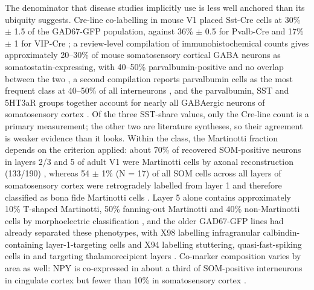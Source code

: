 \documentclass[11pt]{article}
\begin{document}
The denominator that disease studies implicitly use is less well anchored than its ubiquity suggests. Cre-line co-labelling in mouse V1 placed Sst-Cre cells at 30\% $\pm$ 1.5 of the GAD67-GFP population, against 36\% $\pm$ 0.5 for Pvalb-Cre and 17\% $\pm$ 1 for VIP-Cre \citep{Pfeffer2013}; a review-level compilation of immunohistochemical counts gives approximately 20--30\% of mouse somatosensory cortical GABA neurons as somatostatin-expressing, with 40--50\% parvalbumin-positive and no overlap between the two \citep{Lin2013}, a second compilation reports parvalbumin cells as the most frequent class at 40--50\% of all interneurons \citep{Williams2021}, and the parvalbumin, SST and 5HT3aR groups together account for nearly all GABAergic neurons of somatosensory cortex \citep{Rudy2010}. Of the three SST-share values, only the Cre-line count is a primary measurement; the other two are literature syntheses, so their agreement is weaker evidence than it looks. Within the class, the Martinotti fraction depends on the criterion applied: about 70\% of recovered SOM-positive neurons in layers 2/3 and 5 of adult V1 were Martinotti cells by axonal reconstruction (133/190) \citep{Jiang2015}, whereas 54 $\pm$ 1\% (N = 17) of all SOM cells across all layers of somatosensory cortex were retrogradely labelled from layer 1 and therefore classified as bona fide Martinotti cells \citep{Hostetler2023}. Layer 5 alone contains approximately 10\% T-shaped Martinotti, 50\% fanning-out Martinotti and 40\% non-Martinotti cells by morphoelectric classification \citep{Nigro2018}, and the older GAD67-GFP lines had already separated these phenotypes, with X98 labelling infragranular calbindin-containing layer-1-targeting cells and X94 labelling stuttering, quasi-fast-spiking cells in and targeting thalamorecipient layers \citep{Ma2006}. Co-marker composition varies by area as well: NPY is co-expressed in about a third of SOM-positive interneurons in cingulate cortex but fewer than 10\% in somatosensory cortex \citep{Riedemann2019}.
\end{document}
